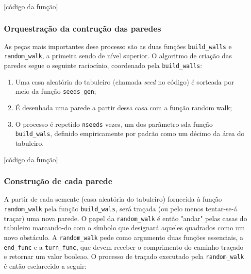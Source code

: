 \documentclass[12pt]{article}
\begin{document}
[código da função]

\subsubsection{Orquestração da contrução das paredes}

As peças mais importantes dese processo são as duas funções \verb|build_walls| e \verb|random_walk|, a primeira sendo de nível superior. O algoritmo de criação das paredes segue o seguinte raciocínio, coordenado pela \verb|build_walls|:

\begin{enumerate}
	\item Uma casa aleatória do tabuleiro (chamada \emph{seed} no código) é sorteada por meio da função \verb|seeds_gen|;
	\item É desenhada uma parede a partir dessa casa com a função random walk;
	\item O processo é repetido \verb|nseeds| vezes, um dos parâmetro sda função \verb|build_wals|, definido empiricamente por padrão como um décimo da área do tabuleiro.
\end{enumerate}

[código da função]


\subsubsection{Construção de cada parede}

A partir de cada semente (casa aleatória do tabuleiro) fornecida à função \verb|random_walk| pela função \verb|build_wals|, será traçada (ou pelo menos tentar-se-á traçar) uma nova parede. O papel da \verb|random_walk| é então "andar" pelas casas do tabuleiro marcando-do com o símbolo que designará aqueles quadrados como um novo obstáculo. A \verb|random_walk| pede como argumento duas funções essenciais, a \verb|end_func| e a \verb|turn_func|, que devem receber o comprimento do caminho traçado e retornar um valor booleao. O processo de traçado executado pela \verb|random_walk| é então esclarecido a seguir:
\end{document}
